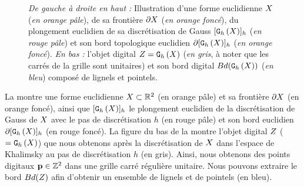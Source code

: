 \begin{figure}[ht]
  \begin{center}
    
  \end{center}
  \caption{\emph{De gauche à droite en haut :} Illustration d'une forme
  euclidienne $X$ (\emph{en orange pâle}), de sa frontière $\partial X$ (\emph{en
  orange foncé}), du plongement euclidien de sa discrétisation de Gauss
  $\lbrack \mathtt{G}_{h}\left(X\right) \rbrack_{h}$ (\emph{en rouge pâle}) et son bord topologique euclidien
  $\partial\lbrack \mathtt{G}_{h}\left(X\right) \rbrack_{h}$ (\emph{en orange foncé}). \emph{En bas :} l'objet
  digital $Z = \mathtt{G}_{h}\left(X\right)$ (\emph{en gris}, à noter que les carrés de la
  grille sont unitaires) et son bord digital $Bd(\mathtt{G}_{h}\left(X\right))$ (\emph{en
  bleu}) composé de lignels et pointels. \label{fig:frontier}}
\end{figure}


La  montre une forme euclidienne $X \subset \mathbb{R}^2$
(en orange pâle) et sa frontière $\partial X$ (en orange foncé), ainsi que
$\lbrack \mathtt{G}_{h}\left(X\right) \rbrack_{h}$ le plongement euclidien de la discrétisation de Gauss de
$X$ avec le pas de discrétisation $h$ (en rouge pâle) et son bord euclidien
$\partial\lbrack \mathtt{G}_{h}\left(X\right) \rbrack_{h}$ (en rouge foncé). La figure du bas de la
 montre l'objet digital $Z$ ($= \mathtt{G}_{h}\left(X\right)$) que nous
obtenons après la discrétisation de $X$ dans l'espace de Khalimsky au pas
de discrétisation $h$ (en gris). Ainsi, nous obtenons des points digitaux $\mathbf{p}
\in \mathbb{Z}^2$ dans une grille carré régulière unitaire. Nous pouvons extraire le
bord $Bd(Z)$ afin d'obtenir un ensemble de lignels et de
pointels (en bleu).


